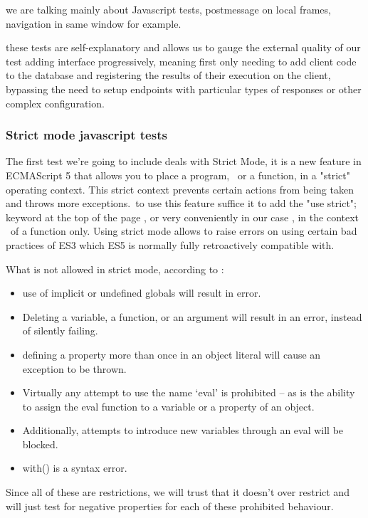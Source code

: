 we are talking mainly about Javascript tests, postmessage on local frames, navigation in same window for example.

these tests are self-explanatory and allows us to gauge the external quality of our test adding interface progressively, meaning first only needing
to add client code to the database and registering the results of their execution on the client, bypassing the need to setup endpoints with particular types
of responses or other complex configuration. 

\subsubsection{Strict mode javascript tests}

The first test we're going to include deals with Strict Mode, it is a new feature in ECMAScript 5 that allows you to place a program, \
or a function, in a "strict" operating context. This strict context prevents certain actions from being taken and throws more exceptions.\
to use this feature suffice it to add the  "use strict"; keyword at the top of the page , or very conveniently in our case , in the context \
of a function only. Using strict mode allows to raise errors on using certain bad practices of ES3 which ES5 is normally fully retroactively compatible with.\

What is not allowed in strict mode, according to \cite{resig}:
\begin{itemize}
 \item use of implicit or undefined globals will result in error.
 \item Deleting a variable, a function, or an argument will result in an error, instead of silently failing.
 \item defining a property more than once in an object literal will cause an exception to be thrown.
 \item Virtually any attempt to use the name ‘eval’ is prohibited – as is the ability to assign the eval function to a variable or a property of an object.
 \item Additionally, attempts to introduce new variables through an eval will be blocked.
 \item with(){} is a syntax error.
\end{itemize}

Since all of these are restrictions, we will trust that it doesn't over restrict and will just test for negative properties for each of these prohibited behaviour.\

